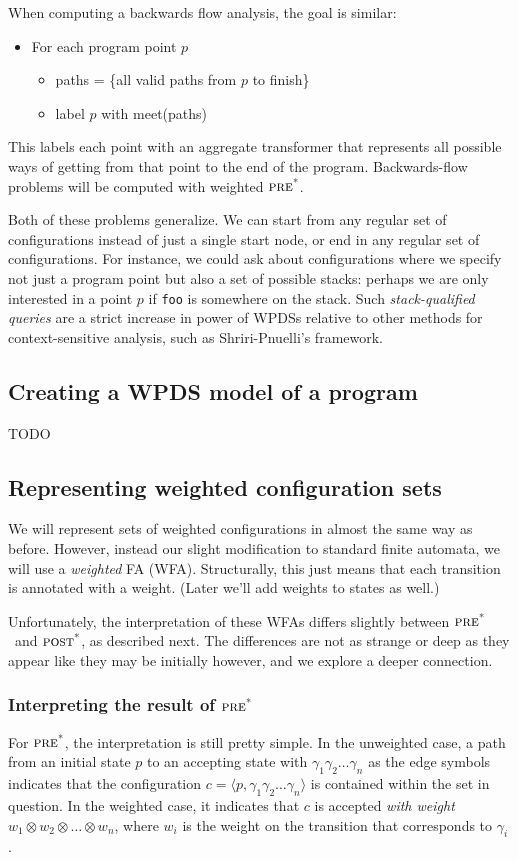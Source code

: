 \documentclass{article}
\newcommand{\Code}[1]{\texttt{#1}}
\newcommand{\Config}[2]{\ensuremath{\langle #1, #2 \rangle}}
\newcommand{\extend}{\otimes}
\newcommand{\poststar}{\ensuremath{\textsc{post}^\textsc{*}}}
\newcommand{\prestar}{\ensuremath{\textsc{pre}^\textsc{*}}}
\begin{document}
When computing a backwards flow analysis, the goal is similar:
\begin{itemize}
\item For each program point $p$
  \begin{itemize}
    \item paths = \{all valid paths from $p$ to finish\}
    \item label $p$ with meet(paths)
  \end{itemize}
\end{itemize}
This labels each point with an aggregate transformer that represents
all possible ways of getting from that point to the end of the
program. Backwards-flow problems will be computed with weighted
\prestar.

Both of these problems generalize. We can start from any regular set
of configurations instead of just a single start node, or end in any
regular set of configurations. For instance, we could ask about
configurations where we specify not just a program point but also a
set of possible stacks: perhaps we are only interested in a point $p$
if \Code{foo} is somewhere on the stack.  Such \emph{stack-qualified
  queries} are a strict increase in power of WPDSs relative to other
methods for context-sensitive analysis, such as Shriri-Pnuelli's
framework.


\subsection{Creating a WPDS model of a program}

TODO


\subsection{Representing weighted configuration sets}

We will represent sets of weighted configurations in almost the same
way as before. However, instead our slight modification to standard
finite automata, we will use a \emph{weighted} FA (WFA). Structurally,
this just means that each transition is annotated with a
weight\footnotemark. (Later we'll add weights to states as well.)

Unfortunately, the interpretation of these WFAs differs slightly
between \prestar\ and \poststar, as described next. The differences
are not as strange or deep as they appear like they may be initially
however, and we explore a deeper connection.

\subsubsection{Interpreting the result of \prestar}
For \prestar, the interpretation is still pretty simple. In the unweighted
case, a path from an initial state $p$ to an accepting state with
$\gamma_1\gamma_2\dots\gamma_n$ as the edge symbols indicates that the
configuration $c = \Config{p}{\gamma_1\gamma_2\dots\gamma_n}$ is
contained within the set in question. In the weighted case, it
indicates that $c$ is accepted \emph{with weight} $w_1 \extend w_2
\extend \dots \extend w_n$, where $w_i$ is the weight on the
transition that corresponds to $\gamma_i$.
\end{document}
